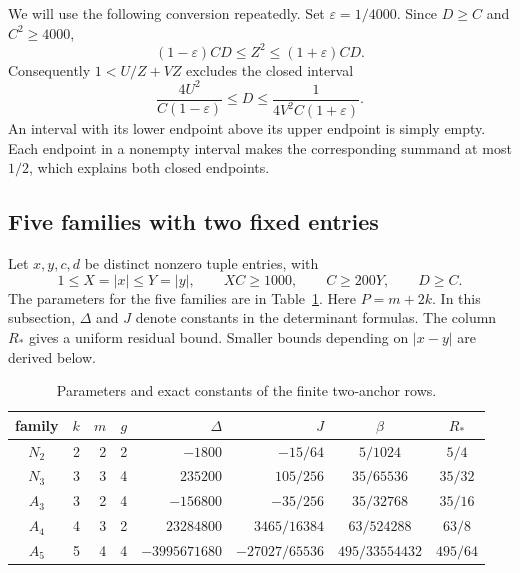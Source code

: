 \documentclass[12pt]{article}
\numberwithin{equation}{section}
\begin{document}
We will use the following conversion repeatedly. Set $\varepsilon=1/4000$.
Since $D\ge C$ and $C^2\ge4000$,
\begin{equation}\label{eq:ff-zcomparison}
 (1-\varepsilon)CD\le Z^2\le(1+\varepsilon)CD.
\end{equation}
Consequently $1<U/Z+VZ$ excludes the closed interval
\begin{equation}\label{eq:ff-window}
 \frac{4U^2}{C(1-\varepsilon)}\le D\le
 \frac{1}{4V^2C(1+\varepsilon)}.
\end{equation}
An interval with its lower endpoint above its upper endpoint is simply
empty. Each endpoint in a nonempty interval makes the corresponding
summand at most $1/2$, which explains both closed endpoints.

\subsection{Five families with two fixed entries}

Let $x,y,c,d$ be distinct nonzero tuple entries, with
\begin{equation}\label{eq:ff-twoguards}
 1\le X=|x|\le Y=|y|,\qquad XC\ge1000,
 \qquad C\ge200Y,\qquad D\ge C.
\end{equation}
The parameters for the five families are in Table~\ref{tab:ff-parameters}.
Here $P=m+2k$. In this subsection, $\Delta$ and $J$ denote constants in the determinant formulas. The column $R_*$ gives a uniform residual bound. Smaller bounds depending on $|x-y|$ are derived below.

\begin{table}[ht]\centering\small
\begin{tabular}{c|rrr|r|r|c|c}
 family&$k$&$m$&$g$&$\Delta$&$J$&$\beta$&$R_*$\\ \hline
 $N_2$&2&2&2&$-1800$&$-15/64$&$5/1024$&$5/4$\\
 $N_3$&3&3&4&$235200$&$105/256$&$35/65536$&$35/32$\\
 $A_3$&3&2&4&$-156800$&$-35/256$&$35/32768$&$35/16$\\
 $A_4$&4&3&2&$23284800$&$3465/16384$&$63/524288$&$63/8$\\
 $A_5$&5&4&4&$-3995671680$&$-27027/65536$&$495/33554432$&$495/64$
\end{tabular}
\caption{Parameters and exact constants of the finite two-anchor rows.}
\label{tab:ff-parameters}
\end{table}
\end{document}
